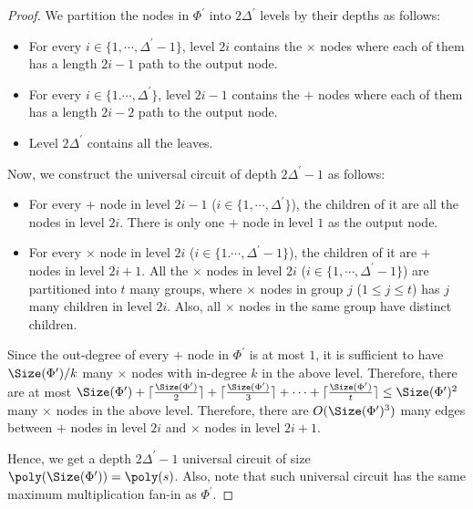 \documentclass[11pt,letter]{article}
\theoremstyle{remark} %
\begin{document}
{\begin{proof}
         We partition the nodes in $\Phi^\prime$ into $2\Delta^\prime$ levels by their depths as follows:
         \begin{itemize}
             \item For every $i \in \{1,\cdots, \Delta^\prime-1 \}$, level $2i$ contains the $\times$ nodes where each of them has a length $2i-1$ path to the output node.
             \item For every $i \in \{1. \cdots, \Delta^\prime\}$, level $2i-1$ contains the $+$ nodes where each of them has a length $2i-2$ path to the output node.
             \item Level $2\Delta^\prime$ contains all the leaves.
         \end{itemize}
         Now, we construct the universal circuit of depth $2\Delta^\prime-1$ as follows:
         \begin{itemize}
             \item For every $+$ node in level $2i-1$ ($i \in \{1,\cdots, \Delta^\prime\}$), the children of it are all the nodes in level $2i$. There is only one $+$ node in level $1$ as the output node.
             \item For every $\times$ node in level $2i$ ($i \in \{1. \cdots, \Delta^\prime-1\}$), the children of it are $+$ nodes in level $2i+1$. All the $\times$ nodes in level $2i$ ($i \in \{1, \cdots, \Delta^\prime-1\}$) are partitioned into $t$ many groups, where $\times$ nodes in group $j$ ($1 \leq j \leq t$) has $j$ many children in level $2i$. Also, all $\times$ nodes in the same group have distinct children.
         \end{itemize}
         Since the out-degree of every $+$ node in $\Phi^\prime$ is at most $1$, it is sufficient to have $\Size(\Phi^\prime)/k$ many $\times$ nodes with in-degree $k$ in the above level. Therefore, there are at most $\Size(\Phi^\prime)+\lceil \frac{\Size(\Phi^\prime)}{2} \rceil+ \lceil \frac{\Size(\Phi^\prime)}{3} \rceil+ \cdots + \lceil \frac{\Size(\Phi^\prime)}{t} \rceil \leq \Size(\Phi^\prime)^2$ many $\times$ nodes in the above level. Therefore, there are $O(\Size(\Phi^\prime)^3)$ many edges between $+$ nodes in level $2i$ and $\times$ nodes in level $2i+1$.

        Hence, we get a depth $2\Delta^\prime-1$ universal circuit of size $\poly(\Size(\Phi^\prime)) = \poly(s)$. Also, note that such universal circuit has the same maximum multiplication fan-in as $\Phi^\prime$.
     \end{proof}
     

}
\end{document}
